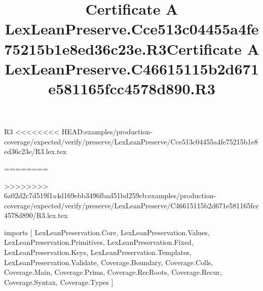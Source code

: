\begin{lexlean}{R3}
<<<<<<<< HEAD:examples/production-coverage/expected/verify/preserve/LexLeanPreserve/Cce513c04455a4fe75215b1e8ed36c23e/R3.lex.tex
\title{Certificate A LexLeanPreserve.Cce513c04455a4fe75215b1e8ed36c23e.R3}
========
\title{Certificate A LexLeanPreserve.C46615115b2d671e581165fcc4578d890.R3}
>>>>>>>> 6a02d2c7d519f1a4d169ebb3496fbad51bd259cb:examples/production-coverage/expected/verify/preserve/LexLeanPreserve/C46615115b2d671e581165fcc4578d890/R3.lex.tex
\begin{coremodule}
imports [
  LexLeanPreservation.Core,
  LexLeanPreservation.Values,
  LexLeanPreservation.Primitives,
  LexLeanPreservation.Fixed,
  LexLeanPreservation.Keys,
  LexLeanPreservation.Templates,
  LexLeanPreservation.Validate,
  Coverage.Boundary,
  Coverage.Colls,
  Coverage.Main,
  Coverage.Prims,
  Coverage.RecRoots,
  Coverage.Recur,
  Coverage.Syntax,
  Coverage.Types
]


\end{coremodule}
\end{lexlean}
